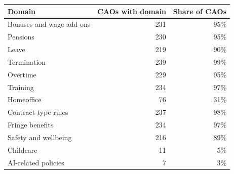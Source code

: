 \begin{tabular}{lrr}
    \hline\hline
    Domain & CAOs with domain & Share of CAOs \\
    \hline
    Bonuses and wage add-ons & 231 & 95\% \\
    Pensions & 230 & 95\% \\
    Leave & 219 & 90\% \\
    Termination & 239 & 99\% \\
    Overtime & 229 & 95\% \\
    Training & 234 & 97\% \\
    Homeoffice & 76 & 31\% \\
    Contract-type rules & 237 & 98\% \\
    Fringe benefits & 234 & 97\% \\
    Safety and wellbeing & 216 & 89\% \\
    Childcare & 11 & 5\% \\
    AI-related policies & 7 & 3\% \\
    \hline\hline
\end{tabular}
